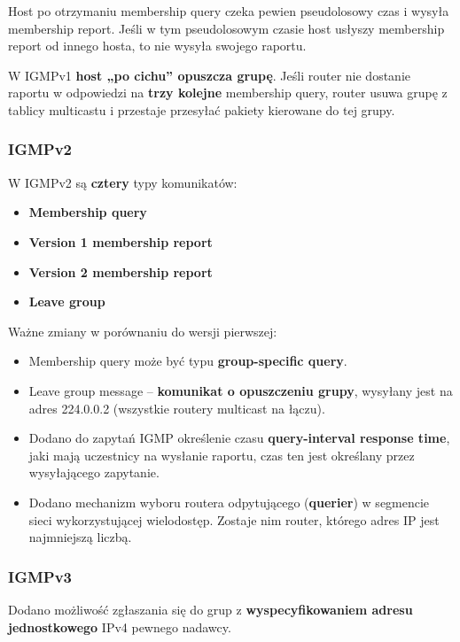 \documentclass[../main.tex]{subfiles}
\begin{document}
    Host po otrzymaniu membership query czeka pewien pseudolosowy czas i wysyła membership report. Jeśli w tym pseudolosowym czasie
    host usłyszy membership report od innego hosta, to nie wysyła swojego raportu.

    W IGMPv1 \textbf{host „po cichu” opuszcza grupę}. Jeśli router nie dostanie raportu w odpowiedzi
    na \textbf{trzy kolejne} membership query,
    router usuwa grupę z tablicy multicastu i przestaje przesyłać pakiety kierowane do tej grupy.

    \subsubsection{IGMPv2}

    W IGMPv2 są \textbf{cztery} typy komunikatów:
    \begin{itemize}
        \item \textbf{Membership query}
        \item \textbf{Version 1 membership report}
        \item \textbf{Version 2 membership report}
        \item \textbf{Leave group}
    \end{itemize}


    Ważne zmiany w porównaniu do wersji pierwszej:
    \begin{itemize}
        \item Membership query może być typu \textbf{group-specific query}.
        \item Leave group message – \textbf{komunikat o opuszczeniu grupy}, wysyłany jest na adres
        224.0.0.2 (wszystkie routery multicast na łączu).
        \item Dodano do zapytań IGMP określenie czasu \textbf{query-interval response time}, jaki mają uczestnicy na wysłanie raportu, czas ten jest określany przez
        wysyłającego zapytanie.
        \item Dodano mechanizm wyboru routera odpytującego (\textbf{querier}) w segmencie sieci
        wykorzystującej wielodostęp. Zostaje nim router, którego adres IP jest najmniejszą
        liczbą.
    \end{itemize}

    \subsubsection{IGMPv3}

    Dodano możliwość zgłaszania się do grup z \textbf{wyspecyfikowaniem adresu
    jednostkowego} IPv4 pewnego nadawcy.
\end{document}

